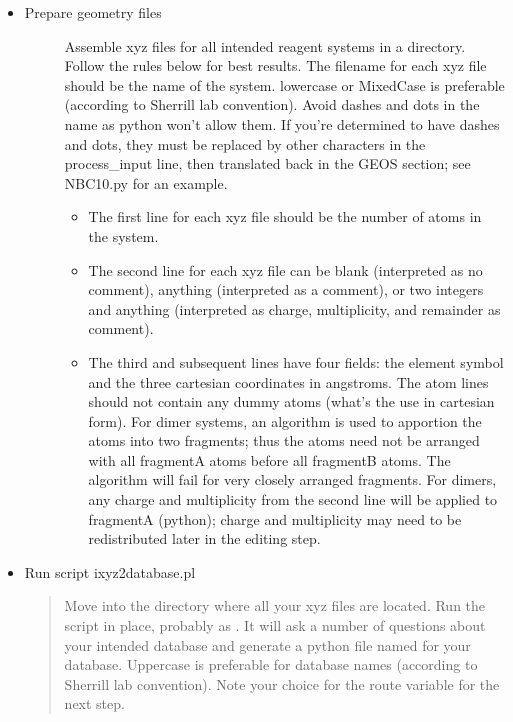 \documentclass[letterpaper,10pt,english]{sphinxmanual}
\begin{document}
\begin{itemize}
\item {} \begin{description}
\item[{Prepare geometry files}] \leavevmode
Assemble xyz files for all intended reagent systems in a directory.
Follow the rules below for best results. The filename for each xyz
file should be the name of the system. lowercase or MixedCase is
preferable (according to Sherrill lab convention). Avoid dashes and
dots in the name as python won't allow them. If you're determined to
have dashes and dots, they must be replaced by other characters in the
process\_input line, then translated back in the GEOS section; see
NBC10.py for an example.
\begin{itemize}
\item {} 
The first line for each xyz file should be the number of atoms in the system.

\item {} 
The second line for each xyz file can be blank (interpreted as no comment), anything (interpreted as a comment), or two integers and anything (interpreted as charge, multiplicity, and remainder as comment).

\item {} 
The third and subsequent lines have four fields: the element symbol and the three cartesian coordinates in angstroms. The atom lines should not contain any dummy atoms (what's the use in cartesian form).  For dimer systems, an algorithm is used to apportion the atoms into two fragments; thus the atoms need not be arranged with all fragmentA atoms before all fragmentB atoms. The algorithm will fail for very closely arranged fragments. For dimers, any charge and multiplicity from the second line will be applied to fragmentA (python); charge and multiplicity may need to be redistributed later in the editing step.

\end{itemize}

\end{description}

\item {} 
Run script ixyz2database.pl
\begin{quote}

Move into the directory where all your xyz files are located. Run the
script in place, probably as
. It will ask a number of
questions about your intended database and generate a python file
named for your database. Uppercase is preferable for database names
(according to Sherrill lab convention). Note your choice for the route
variable for the next step.
\end{quote}


\end{itemize}
\end{document}
